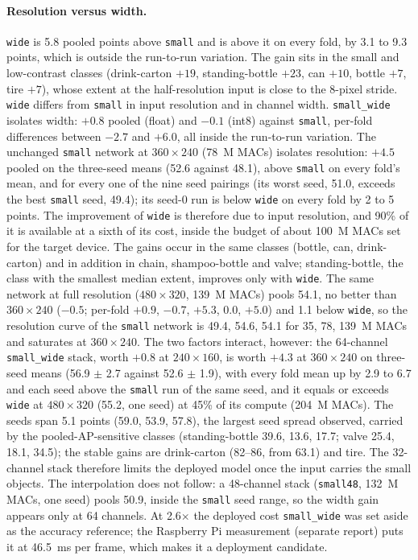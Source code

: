 \documentclass[11pt,a4paper]{article}
\newcommand{\cfg}[1]{\texttt{#1}}
\begin{document}
\paragraph{Resolution versus width.} \cfg{wide} is 5.8 pooled points above
\cfg{small} and is above it on every fold, by 3.1 to 9.3 points, which is
outside the run-to-run variation. The gain sits in the small and
low-contrast classes (drink-carton $+19$, standing-bottle $+23$, can $+10$,
bottle $+7$, tire $+7$), whose extent at the half-resolution input is close
to the 8-pixel stride. \cfg{wide} differs from \cfg{small} in input
resolution and in channel width. \cfg{small\_wide} isolates width: $+0.8$
pooled (float) and $-0.1$ (int8) against \cfg{small}, per-fold differences
between $-2.7$ and $+6.0$, all inside the run-to-run variation. The
unchanged \cfg{small} network at $360 \times 240$ (78~M MACs) isolates
resolution: $+4.5$ pooled on the three-seed means (52.6 against 48.1),
above \cfg{small} on every fold's mean, and for every one of the nine seed
pairings (its worst seed, 51.0, exceeds the best \cfg{small} seed, 49.4);
its seed-0 run is below \cfg{wide} on every fold by 2 to 5 points. The improvement of \cfg{wide}
is therefore due to input resolution, and 90\% of it is available at a sixth
of its cost, inside the budget of about 100~M MACs set for the target
device. The gains occur in the same classes (bottle, can, drink-carton) and
in addition in chain, shampoo-bottle and valve; standing-bottle, the class
with the smallest median extent, improves only with \cfg{wide}. The same
network at full resolution ($480 \times 320$, 139~M MACs) pools 54.1, no
better than $360 \times 240$ ($-0.5$; per-fold $+0.9$, $-0.7$, $+5.3$, $0.0$,
$+5.0$) and 1.1 below \cfg{wide}, so the resolution curve of the \cfg{small}
network is 49.4, 54.6, 54.1 for 35, 78, 139~M MACs and saturates at
$360 \times 240$. The two factors interact, however: the 64-channel
\cfg{small\_wide} stack, worth $+0.8$ at $240 \times 160$, is worth $+4.3$
at $360 \times 240$ on three-seed means (56.9 $\pm$ 2.7 against 52.6 $\pm$
1.9), with every fold mean up by 2.9 to 6.7 and each seed above the
\cfg{small} run of the same seed, and it equals or exceeds \cfg{wide} at
$480 \times 320$ (55.2, one seed) at 45\% of its compute (204~M MACs). The
seeds span 5.1 points (59.0, 53.9, 57.8), the largest seed spread observed,
carried by the pooled-AP-sensitive classes (standing-bottle 39.6, 13.6,
17.7; valve 25.4, 18.1, 34.5); the stable gains are drink-carton (82--86,
from 63.1) and tire. The 32-channel stack therefore limits the deployed
model once the input carries the small objects. The interpolation does not
follow: a 48-channel stack (\cfg{small48}, 132~M MACs, one seed) pools
50.9, inside the \cfg{small} seed range, so the width gain appears only at
64 channels. At 2.6$\times$ the deployed cost \cfg{small\_wide} was set
aside as the accuracy reference; the Raspberry Pi measurement (separate
report) puts it at 46.5~ms per frame, which makes it a deployment
candidate.
\end{document}
